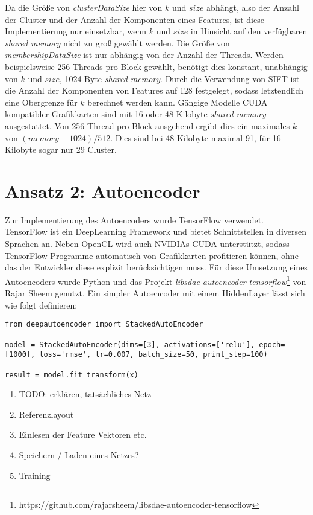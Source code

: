 Da die Größe von \textit{clusterDataSize} hier von $k$ und $size$ abhängt, also der Anzahl der Cluster und der Anzahl der Komponenten eines Features, ist diese Implementierung nur einsetzbar, wenn $k$ und $size$ in Hinsicht auf den verfügbaren \textit{shared memory} nicht zu groß gewählt werden. Die Größe von \textit{membershipDataSize} ist nur abhängig von der Anzahl der Threads. Werden beispielsweise 256 Threads pro Block gewählt, benötigt dies konstant, unabhängig von $k$ und $size$, 1024 Byte \textit{shared memory}. Durch die Verwendung von SIFT ist die Anzahl der Komponenten von Features auf 128 festgelegt, sodass letztendlich eine Obergrenze für $k$ berechnet werden kann. Gängige Modelle CUDA kompatibler Grafikkarten sind mit 16 oder 48 Kilobyte \textit{shared memory} ausgestattet. Von 256 Thread pro Block ausgehend ergibt dies ein maximales $k$ von $(memory - 1024) / 512$. Dies sind bei 48 Kilobyte maximal 91, für 16 Kilobyte sogar nur 29 Cluster. 

\section{Ansatz 2: Autoencoder}

Zur Implementierung des Autoencoders wurde TensorFlow verwendet. TensorFlow ist ein DeepLearning Framework und bietet Schnittstellen in diversen Sprachen an. Neben OpenCL wird auch NVIDIAs CUDA unterstützt, sodass TensorFlow Programme automatisch von Grafikkarten profitieren können, ohne das der Entwickler diese explizit berücksichtigen muss. Für diese Umsetzung eines Autoencoders wurde Python und das Projekt \textit{libsdae-autoencoder-tensorflow}\footnote{https://github.com/rajarsheem/libsdae-autoencoder-tensorflow} von Rajar Sheem genutzt. Ein simpler Autoencoder mit einem HiddenLayer lässt sich wie folgt definieren:

\lstset{language=Python}
\begin{lstlisting}
from deepautoencoder import StackedAutoEncoder

model = StackedAutoEncoder(dims=[3], activations=['relu'], epoch=[1000], loss='rmse', lr=0.007, batch_size=50, print_step=100)
                       
result = model.fit_transform(x)
\end{lstlisting}

\begin{enumerate}
	\item TODO: erklären, tatsächliches Netz
	\item Referenzlayout
	\item Einlesen der Feature Vektoren etc.
	\item Speichern / Laden eines Netzes?
	\item Training
\end{enumerate}